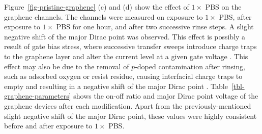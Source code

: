 \documentclass[
  a4paper,
]{scrbook}
\begin{document}
Figure~\ref{fig-pristine-graphene} (c) and (d) show the effect of
\(1 \times\) PBS on the graphene channels. The channels were measured on
exposure to \(1 \times\) PBS, after exposure to \(1 \times\) PBS for one
hour, and after two successive rinse steps. A slight negative shift of
the major Dirac point was observed. This effect is possibly a result of
gate bias stress, where successive transfer sweeps introduce charge
traps to the graphene layer and alter the current level at a given gate
voltage \autocite{Bargaoui2018,Noyce2019}. This effect may also be due
to the removal of \(p\)-doped contamination after rinsing, such as
adsorbed oxygen or resist residue, causing interfacial charge traps to
empty and resulting in a negative shift of the major Dirac point
\autocite{Bartolomeo2011,Kireev2017,Peng2018}.
Table~\ref{tbl-graphene-parameters} shows the on-off ratio and major
Dirac point voltage of the graphene devices after each modification.
Apart from the previously-mentioned slight negative shift of the major
Dirac point, these values were highly consistent before and after
exposure to \(1 \times\) PBS.
\end{document}

